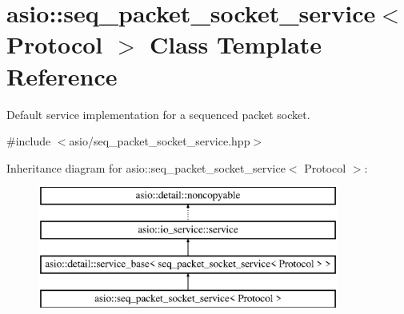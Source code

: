 \hypertarget{classasio_1_1seq__packet__socket__service}{}\section{asio\+:\+:seq\+\_\+packet\+\_\+socket\+\_\+service$<$ Protocol $>$ Class Template Reference}
\label{classasio_1_1seq__packet__socket__service}


Default service implementation for a sequenced packet socket.  




{\ttfamily \#include $<$asio/seq\+\_\+packet\+\_\+socket\+\_\+service.\+hpp$>$}

Inheritance diagram for asio\+:\+:seq\+\_\+packet\+\_\+socket\+\_\+service$<$ Protocol $>$\+:\begin{figure}[H]
\begin{center}
\leavevmode
\includegraphics[height=4.000000cm]{classasio_1_1seq__packet__socket__service}
\end{center}
\end{figure}
